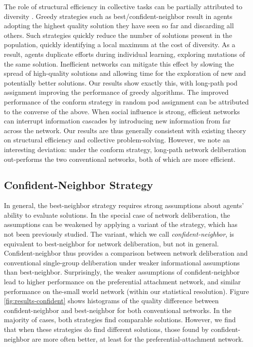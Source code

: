 The role of structural efficiency in collective tasks can be partially attributed to diversity \cite{lazer_network_2007, hong_groups_2004}. Greedy strategies such as best/confident-neighbor result in agents adopting the highest quality solution they have seen so far and discarding all others. Such strategies quickly reduce the number of solutions present in the population, quickly identifying a local maximum at the cost of diversity. As a result, agents duplicate efforts during individual learning, exploring mutations of the same solution. Inefficient networks can mitigate this effect by slowing the spread of high-quality solutions and allowing time for the exploration of new and potentially better solutions. Our results show exactly this, with long-path pod assignment improving the performance of greedy algorithms. The improved performance of the conform strategy in random pod assignment can be attributed to the converse of the above. When social influence is strong, efficient networks can interrupt information cascades by introducing new information from far across the network.
Our results are thus generally consistent with existing theory on structural efficiency and collective problem-solving.
However, we note an interesting deviation: under the conform strategy, long-path network deliberation out-performs the two conventional networks, both of which are more efficient.

\subsection{Confident-Neighbor Strategy}

In general, the best-neighbor strategy requires strong assumptions about agents' ability to evaluate solutions. In the special case of network deliberation, the assumptions can be weakened by applying a variant of the strategy, which has not been previously studied. The variant, which we call {\em confident-neighbor}, is equivalent to best-neighbor for network deliberation, but not in general. Confident-neighbor thus provides a comparison between network deliberation and conventional single-group deliberation under weaker informational assumptions than best-neighbor. Surprisingly, the weaker assumptions of confident-neighbor lead to higher performance on the preferential attachment network, and similar performance on the-small world network (within our statistical resolution). Figure \ref{fig:results-confident} shows histograms of the quality difference between confident-neighbor and best-neighbor for both conventional networks. In the majority of cases, both strategies find comparable solutions. However, we find that when these strategies do find different solutions, those found by confident-neighbor are more often better, at least for the preferential-attachment network.

